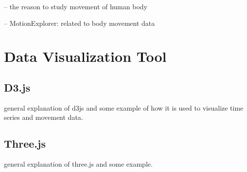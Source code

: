 -- the reason to study movement of human body

-- MotionExplorer: related to body movement data



\section{Data Visualization Tool}
\subsection{D3.js}
general explanation of d3js and some example of how it is used to visualize time series and movement data.

\subsection{Three.js}
general explanation of three.js and some example.

